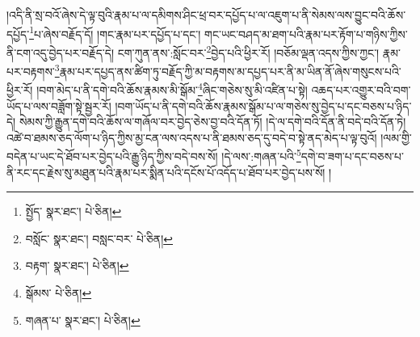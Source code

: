 །འདི་ནི་སྲ་བའོ་ཞེས་དེ་ལྟ་བུའི་རྣམ་པ་ལ་དམིགས་ཤིང་ཕྲ་བར་དཔྱོད་པ་ལ་འཇུག་པ་ནི་སེམས་ལས་བྱུང་བའི་ཆོས་དཔྱོད་\footnote{སྤྱོད་  སྣར་ཐང་།  པེ་ཅིན། }པ་ཞེས་བརྗོད་དོ། །གང་རྣམ་པར་དཔྱོད་པ་དང་། གང་ཡང་བཤད་མ་ཐག་པའི་རྣམ་པར་རྟོག་པ་གཉིས་ཀྱིས་ནི་ངག་འདུ་བྱེད་པར་བརྗོད་དེ། ངག་ཀུན་ནས་:སློང་བར་\footnote{བསློང་  སྣར་ཐང་། བསླང་བར་  པེ་ཅིན། }བྱེད་པའི་ཕྱིར་རོ། །བཅོམ་ལྡན་འདས་ཀྱིས་ཀྱང་། རྣམ་པར་བརྟགས་\footnote{བརྟག་  སྣར་ཐང་།  པེ་ཅིན། }རྣམ་པར་དཔྱད་ནས་ཚིག་ཏུ་བརྗོད་ཀྱི་མ་བརྟགས་མ་དཔྱད་པར་ནི་མ་ཡིན་ནོ་ཞེས་གསུངས་པའི་ཕྱིར་རོ། །བག་མེད་པ་ནི་དགེ་བའི་ཆོས་རྣམས་མི་སྒོམ་\footnote{སྒོམས་  པེ་ཅིན། }ཞིང་གཅེས་སུ་མི་འཛིན་པ་སྟེ། འཆད་པར་འགྱུར་བའི་བག་ཡོད་པ་ལས་བཟློག་སྟེ་སྦྱར་རོ། །བག་ཡོད་པ་ནི་དགེ་བའི་ཆོས་རྣམས་སྒོམ་པ་ལ་གཅེས་སུ་བྱེད་པ་དང་བཅས་པ་ཉིད་དེ། སེམས་ཀྱི་རྒྱུན་དགེ་བའི་ཆོས་ལ་གཞོལ་བར་བྱེད་ཅེས་བྱ་བའི་དོན་ཏོ། །དེ་ལ་དགེ་བའི་དོན་ནི་བདེ་བའི་དོན་ཏེ། འཚེ་བ་ཐམས་ཅད་ལོག་པ་ཉིད་ཀྱིས་མྱ་ངན་ལས་འདས་པ་ནི་ཐམས་ཅད་དུ་བདེ་བ་སྟེ་ནད་མེད་པ་ལྟ་བུའོ། །ལམ་གྱི་བདེན་པ་ཡང་དེ་ཐོབ་པར་བྱེད་པའི་རྒྱུ་ཉིད་ཀྱིས་བདེ་བས་སོ། །དེ་ལས་:གཞན་པའི་\footnote{གཞན་པ་  སྣར་ཐང་།  པེ་ཅིན། }དགེ་བ་ཟག་པ་དང་བཅས་པ་ནི་རང་དང་རྗེས་སུ་མཐུན་པའི་རྣམ་པར་སྨིན་པའི་དངོས་པོ་འདོད་པ་ཐོབ་པར་བྱེད་པས་སོ། །
